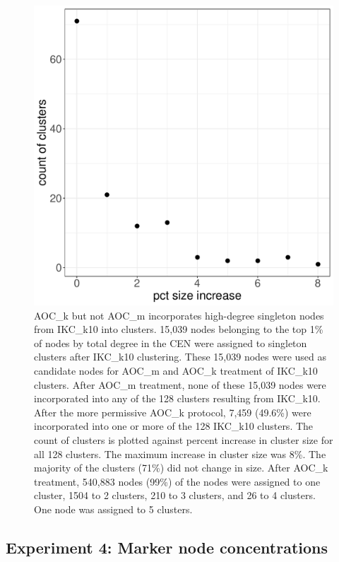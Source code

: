 \documentclass[12pt, oneside]{article}   	%
\begin{document}
	\begin{figure}[H]
		\centering
		\includegraphics[width=0.6\linewidth]{singletons.pdf} 
		\caption{AOC\_k but not AOC\_m incorporates high-degree singleton nodes from IKC\_k10 into clusters. 15,039 nodes belonging to the top  1\% of nodes by total degree in the CEN were assigned to singleton clusters after IKC\_k10 clustering. 
			These 15,039  nodes were used as candidate nodes for AOC\_m and AOC\_k treatment of IKC\_k10 clusters. After AOC\_m treatment, none of these 15,039 nodes were incorporated into any of the 128 clusters resulting from  IKC\_k10. After the more permissive AOC\_k protocol, 7,459 (49.6\%) were incorporated into one or more of the 128 IKC\_k10 clusters. The count of clusters is plotted against percent increase in cluster size for all 128 clusters. The maximum increase in cluster size was 8\%. The majority of the clusters (71\%) did not change in size. After AOC\_k treatment, 540,883 nodes (99\%) of the nodes were assigned to one cluster, 1504 to 2 clusters, 210 to 3 clusters, and 26 to 4 clusters. One node was assigned to 5 clusters.}
		\label{fig:singleton}
	\end{figure}
	
	\subsection{Experiment 4: Marker node concentrations}
	
\end{document}
